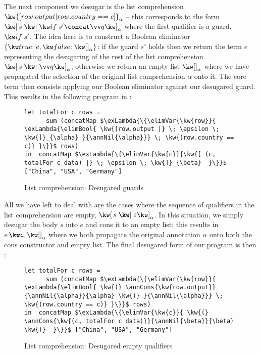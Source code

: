 \noindent
The next component we desugar is the list comprehension $\kw{[ row.output | row.country == c ]}_{\alpha}$ -- this corresponds to the form $\annListComp{s}{\qualGuard{s'} \concat \vec{q}}{\alpha}$ where the first qualifier is a guard, $\qualGuard{s'}$. The idea here is to construct a Boolean eliminator $\elimBool{e}{\annNil{\alpha}}$: if the guard $s'$ holds then we return the term $e$ representing the desugaring of the rest of the list comprehension $\annListComp{s}{\vec{q}}{\alpha}$, otherwise we return an empty list $\annNil{\alpha}$ where we have propagated the selection of the original list comprehension $\alpha$ onto it. The core term then consists applying our Boolean eliminator against our desugared guard. This results in the following program in :

\begin{figure}[H]
   \small
\begin{lstlisting}
let totalFor c rows =
      sum (concatMap $\exLambda{\{\elimVar{\kw{row}}{  \exLambda{\elimBool{ \kw{[row.output |} \; \epsilon \; \kw{]}_{\alpha} }{\annNil{\alpha}}} \; \kw{(row.country == c)} }\}}$ rows)
in  concatMap $\exLambda{\{\elimVar{\kw{c}}{\kw{[ (c, totalFor c data) |} \; \epsilon \; \kw{]}_{\beta}  }\}}$ ["China", "USA", "Germany"]
\end{lstlisting}
   \caption{List comprehension: Desugared guards}
   \label{fig:surface-language:example-3}
\end{figure}

All we have left to deal with are the cases where the sequence of qualifiers in the list comprehension are empty, $\annListComp{s}{\seqEmpty}{\alpha}$. In this situation, we simply desugar the body $s$ into $e$ and cons it to an empty list; this results in $\annCons{e}{\annNil{\alpha}}{\alpha}$ where we both propagate the original annotation $\alpha$ onto both the cons constructor and empty list. The final desugared form of our program is then :

\begin{figure}[H]
\small
\begin{lstlisting}
let totalFor c rows =
      sum (concatMap $\exLambda{\{\elimVar{\kw{row}}{  \exLambda{\elimBool{ \kw{(} \annCons{\kw{row.output}}{\annNil{\alpha}}{\alpha} \kw{)} }{\annNil{\alpha}}} \; \kw{(row.country == c)} }\}}$ rows)
in  concatMap $\exLambda{\{\elimVar{\kw{c}}{ \kw{(} \annCons{\kw{(c, totalFor c data)}}{\annNil{\beta}}{\beta} \kw{)}  }\}}$ ["China", "USA", "Germany"]
\end{lstlisting}
\caption{List comprehension: Desugared empty qualifiers}
\label{fig:surface-language:example-4}
\end{figure}

